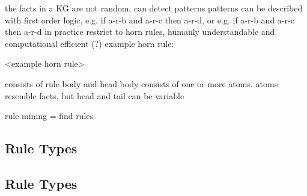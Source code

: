 the facts in a KG are not random, can detect patterns
patterns can be described with first order logic, e.g. if a-r-b and a-r-c then a-r-d, or e.g. if a-r-b and a-r-c then a-r-d
in practice restrict to horn rules, humanly understandable and computational efficient (?)
example horn rule:

<example horn rule>

consists of rule body and head
body consists of one or more atoms.
atoms resemble facts, but head and tail can be variable

rule mining = find rules

\subsection{Rule Types}
\label{subsec:2_basics/2_rules/1_rule_types}


\subsection{Rule Types}
\label{subsec:2_basics/2_rules/2_rule_metrics}


